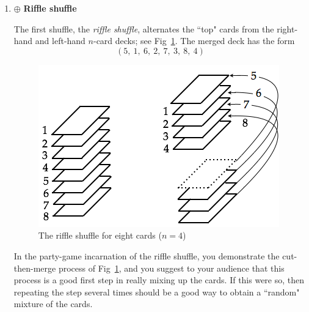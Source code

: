 \begin{enumerate}
  \begin{enumerate}
  \item $\oplus$ {\bf Riffle shuffle}

\smallskip

The first shuffle, the \textit{riffle shuffle}, alternates the ``top" cards from the right-hand and left-hand $n$-card decks; see Fig~\ref{fig:suffleMonge}.  
The merged deck has the form
\[ (5, \ 1, \ 6, \ 2, \ 7, \ 3, \ 8, \ 4) \]
\begin{figure}[h]
\begin{center}
        \includegraphics[scale=0.4]{FiguresArithmetic/suffleMongeBasic}
        \caption{The riffle shuffle for eight cards ($n=4$)}
        \label{fig:suffleMonge}
\end{center}
\end{figure}

In the party-game incarnation of the riffle shuffle, you demonstrate the cut-then-merge process of Fig~\ref{fig:suffleMonge}, and you suggest to your audience that this process is a good first step in really mixing up the cards.  If this were so, then repeating the step several times should be a good way to obtain a ``random" mixture of the cards.

\smallskip


\end{enumerate}
\end{enumerate}
